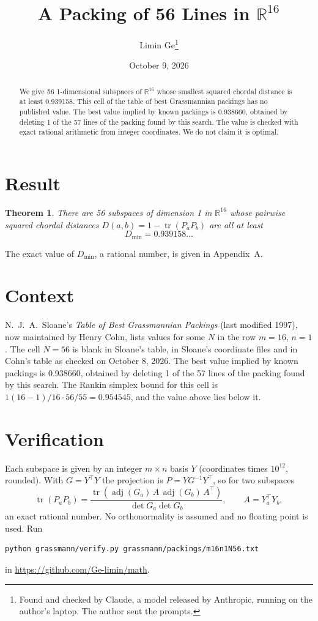 \documentclass[11pt,a4paper]{article}
\title{A Packing of 56 Lines in $\mathbb{R}^{16}$}
\author{Limin Ge\thanks{Found and checked by Claude, a model released by Anthropic, running on the author's laptop. The author sent the prompts.}}
\date{October 9, 2026}
\newtheorem*{theorem}{Theorem}
\begin{document}
\maketitle
\begin{abstract}
We give 56 1-dimensional subspaces of $\mathbb{R}^{16}$ whose smallest squared chordal distance is at least 0.939158. This cell of the table of best Grassmannian packings has no published value. The best value implied by known packings is 0.938660, obtained by deleting 1 of the 57 lines of the packing found by this search. The value is checked with exact rational arithmetic from integer coordinates. We do not claim it is optimal.
\end{abstract}

\section{Result}
\begin{theorem}
There are 56 subspaces of dimension 1 in $\mathbb{R}^{16}$ whose pairwise squared chordal distances $D(a,b) = 1 - \operatorname{tr}(P_aP_b)$ are all at least
\[ D_{\min} = 0.939158\ldots \]
\end{theorem}
The exact value of $D_{\min}$, a rational number, is given in Appendix~A.


\section{Context}
N.~J.~A.~Sloane's \emph{Table of Best Grassmannian Packings} (last modified 1997), now maintained by Henry Cohn, lists values for some $N$ in the row $m=16$, $n=1$. The cell $N=56$ is blank in Sloane's table, in Sloane's coordinate files and in Cohn's table as checked on October 8, 2026. The best value implied by known packings is 0.938660, obtained by deleting 1 of the 57 lines of the packing found by this search. The Rankin simplex bound for this cell is $1(16-1)/16\cdot 56/55 = 0.954545$, and the value above lies below it.


\section{Verification}
Each subspace is given by an integer $m\times n$ basis $Y$ (coordinates times $10^{12}$, rounded). With $G=Y^\top Y$ the projection is $P=YG^{-1}Y^\top$, so for two subspaces
\[ \operatorname{tr}(P_aP_b)=\frac{\operatorname{tr}(\operatorname{adj}(G_a)\,A\,\operatorname{adj}(G_b)\,A^\top)}{\det G_a\det G_b},\qquad A=Y_a^\top Y_b, \]
an exact rational number. No orthonormality is assumed and no floating point is used. Run
\begin{verbatim}
python grassmann/verify.py grassmann/packings/m16n1N56.txt
\end{verbatim}
in \url{https://github.com/Ge-limin/math}.
\end{document}
